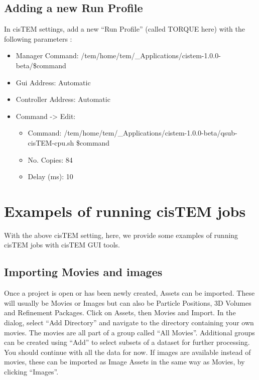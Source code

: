 \documentclass[letterpaper,10pt,english]{sphinxmanual}
\begin{document}
\subsection{Adding a new Run Profile}
\label{\detokenize{cisTEM:adding-a-new-run-profile}}
In cisTEM settings, add a new “Run Profile” (called TORQUE here) with the following parameters :
\begin{itemize}
\item {} 
Manager Command: /tem/home/tem/\_Applications/cistem-1.0.0-beta/\$command

\item {} 
Gui Address: Automatic

\item {} 
Controller Address: Automatic

\item {} 
Command -\textgreater{} Edit:
\begin{itemize}
\item {} 
Command: /tem/home/tem/\_Applications/cistem-1.0.0-beta/qsub-cisTEM-cpu.sh  \$command

\item {} 
No. Copies: 84

\item {} 
Delay (ms): 10

\end{itemize}

\end{itemize}



\section{Exampels of running cisTEM jobs}
\label{\detokenize{cisTEM:exampels-of-running-cistem-jobs}}
With the above cisTEM setting, here, we provide some examples of running cisTEM jobs with cisTEM GUI tools.


\subsection{Importing Movies and images}
\label{\detokenize{cisTEM:importing-movies-and-images}}
Once a project is open or has been newly created, Assets can be imported. These will usually be Movies or Images but can also be Particle Positions, 3D Volumes and Refinement Packages.
Click on Assets, then Movies and Import. In the dialog, select “Add Directory” and navigate to the directory containing your own movies.
The movies are all part of a group called “All Movies”. Additional groups can be created using “Add” to select subsets of a dataset for further processing.
You should continue with all the data for now. If images are available instead of movies,
these can be imported as Image Assets in the same way as Movies, by clicking “Images”.
\end{document}

